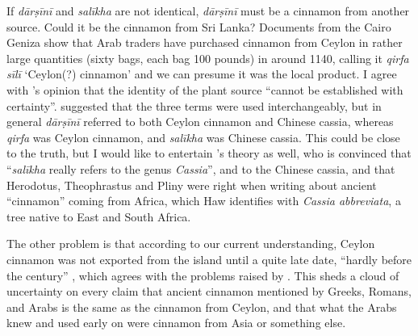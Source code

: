 If \textit{dārṣīnī} and \textit{salīkha} are not identical, \textit{dārṣīnī} must be a cinnamon from another source. Could it be the cinnamon from Sri Lanka? Documents from the Cairo Geniza show that Arab traders have purchased cinnamon from Ceylon in rather large quantities (sixty bags, each bag 100 pounds) in around 1140, calling it \textit{qirfa sīlī} `Ceylon(?) cinnamon' \parencites[375]{goitein_india_2008} and we can presume it was the local product. I agree with \textcite{dietrich_dar_2004}'s opinion that the identity of the plant source ``cannot be established with certainty''. \textcite[143-144]{lev_practical_2008} suggested that the three terms were used interchangeably, but in general \textit{dārṣīnī} referred to both Ceylon cinnamon and Chinese cassia, whereas \textit{qirfa} was Ceylon cinnamon, and \textit{salīkha} was Chinese cassia. This could be close to the truth, but I would like to entertain \textcite{haw_cinnamon_2017}'s theory as well, who is convinced that ``\textit{salīkha} really refers to the genus \textit{Cassia}'', and to the Chinese cassia,
and that Herodotus, Theophrastus and Pliny were right when writing about ancient ``cinnamon'' coming from Africa, which Haw identifies with \textit{Cassia abbreviata}, a tree native to East and South Africa.

The other problem is that according to our current understanding, Ceylon cinnamon was not exported from the island until a quite late date, ``hardly before the  century'' \parencite{dietrich_dar_2004}, which agrees with the problems raised by \textcite{haw_cinnamon_2017}. This sheds a cloud of uncertainty on every claim that ancient cinnamon mentioned by Greeks, Romans, and Arabs is the same as the cinnamon from Ceylon, and that what the Arabs knew and used early on were cinnamon from Asia or something else.

